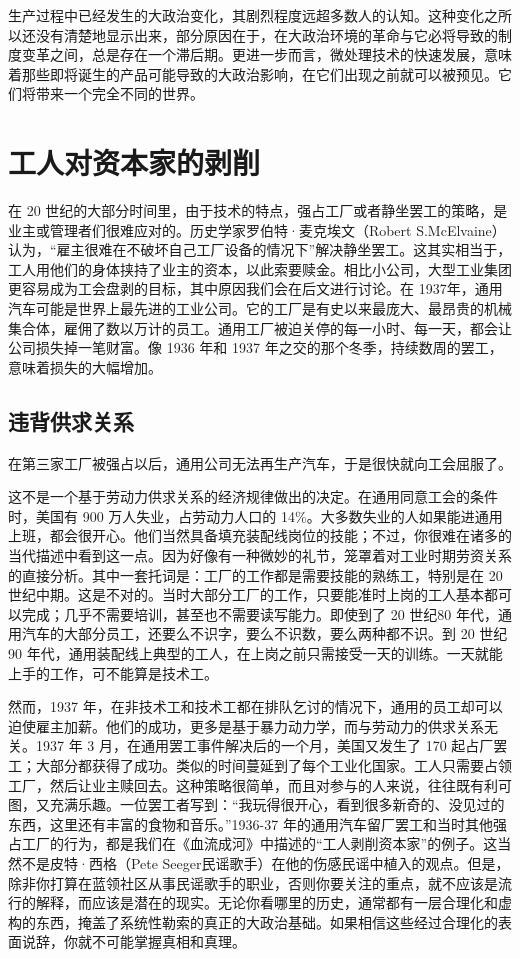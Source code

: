 生产过程中已经发生的大政治变化，其剧烈程度远超多数人的认知。这种变化之所以还没有清楚地显示出来，部分原因在于，在大政治环境的革命与它必将导致的制度变革之间，总是存在一个滞后期。更进一步而言，微处理技术的快速发展，意味着那些即将诞生的产品可能导致的大政治影响，在它们出现之前就可以被预见。它们将带来一个完全不同的世界。

\section{工人对资本家的剥削}
在 20 世纪的大部分时间里，由于技术的特点，强占工厂或者静坐罢工的策略，是业主或管理者们很难应对的。历史学家罗伯特·麦克埃文（Robert S.McElvaine）认为，“雇主很难在不破坏自己工厂设备的情况下”解决静坐罢工。这其实相当于，工人用他们的身体挟持了业主的资本，以此索要赎金。相比小公司，大型工业集团更容易成为工会盘剥的目标，其中原因我们会在后文进行讨论。在 1937年，通用汽车可能是世界上最先进的工业公司。它的工厂是有史以来最庞大、最昂贵的机械集合体，雇佣了数以万计的员工。通用工厂被迫关停的每一小时、每一天，都会让公司损失掉一笔财富。像 1936 年和 1937 年之交的那个冬季，持续数周的罢工，意味着损失的大幅增加。

\subsection{违背供求关系}
在第三家工厂被强占以后，通用公司无法再生产汽车，于是很快就向工会屈服了。

这不是一个基于劳动力供求关系的经济规律做出的决定。在通用同意工会的条件时，美国有 900 万人失业，占劳动力人口的 14\%。大多数失业的人如果能进通用上班，都会很开心。他们当然具备填充装配线岗位的技能；不过，你很难在诸多的当代描述中看到这一点。因为好像有一种微妙的礼节，笼罩着对工业时期劳资关系的直接分析。其中一套托词是：工厂的工作都是需要技能的熟练工，特别是在 20 世纪中期。这是不对的。当时大部分工厂的工作，只要能准时上岗的工人基本都可以完成；几乎不需要培训，甚至也不需要读写能力。即使到了 20 世纪80 年代，通用汽车的大部分员工，还要么不识字，要么不识数，要么两种都不识。到 20 世纪 90 年代，通用装配线上典型的工人，在上岗之前只需接受一天的训练。一天就能上手的工作，可不能算是技术工。

然而，1937 年，在非技术工和技术工都在排队乞讨的情况下，通用的员工却可以迫使雇主加薪。他们的成功，更多是基于暴力动力学，而与劳动力的供求关系无关。1937 年 3 月，在通用罢工事件解决后的一个月，美国又发生了 170 起占厂罢工；大部分都获得了成功。类似的时间蔓延到了每个工业化国家。工人只需要占领工厂，然后让业主赎回去。这种策略很简单，而且对参与的人来说，往往既有利可图，又充满乐趣。一位罢工者写到：“我玩得很开心，看到很多新奇的、没见过的东西，这里还有丰富的食物和音乐。”1936-37 年的通用汽车留厂罢工和当时其他强占工厂的行为，都是我们在《血流成河》中描述的“工人剥削资本家”的例子。这当然不是皮特·西格（Pete Seeger民谣歌手）在他的伤感民谣中植入的观点。但是，除非你打算在蓝领社区从事民谣歌手的职业，否则你要关注的重点，就不应该是流行的解释，而应该是潜在的现实。无论你看哪里的历史，通常都有一层合理化和虚构的东西，掩盖了系统性勒索的真正的大政治基础。如果相信这些经过合理化的表面说辞，你就不可能掌握真相和真理。

